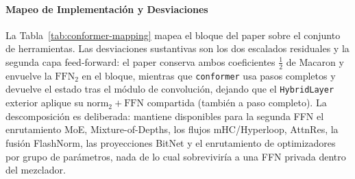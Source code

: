 \paragraph{Mapeo de Implementación y Desviaciones}

La Tabla~\ref{tab:conformer-mapping} mapea el bloque del paper sobre el conjunto de herramientas. Las desviaciones sustantivas son los dos escalados residuales y la segunda capa feed-forward: el paper conserva ambos coeficientes $\tfrac12$ de Macaron y envuelve la $\mathrm{FFN}_2$ en el bloque, mientras que \texttt{conformer} usa pasos completos y devuelve el estado tras el módulo de convolución, dejando que el \texttt{HybridLayer} exterior aplique su $\mathrm{norm}_2 + \mathrm{FFN}$ compartida (también a paso completo). La descomposición es deliberada: mantiene disponibles para la segunda FFN el enrutamiento MoE, Mixture-of-Depths, los flujos mHC/Hyperloop, AttnRes, la fusión FlashNorm, las proyecciones BitNet y el enrutamiento de optimizadores por grupo de parámetros, nada de lo cual sobreviviría a una FFN privada dentro del mezclador.

